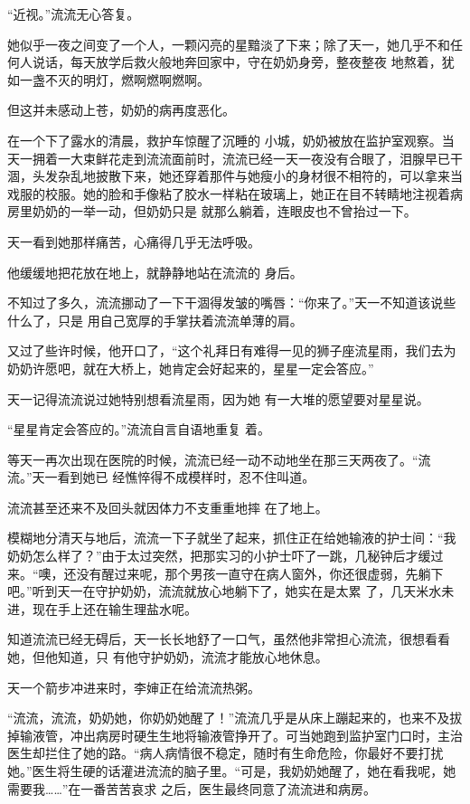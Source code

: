 \documentclass{article}
\begin{document}
“近视。”流流无心答复。 

她似乎一夜之间变了一个人，一颗闪亮的星黯淡了下来；除了天一，她几乎不和任何人说话，每天放学后救火般地奔回家中，守在奶奶身旁，整夜整夜
地熬着，犹如一盏不灭的明灯，燃啊燃啊燃啊。 


但这并未感动上苍，奶奶的病再度恶化。 

在一个下了露水的清晨，救护车惊醒了沉睡的
\newpage
小城，奶奶被放在监护室观察。当天一拥着一大束鲜花走到流流面前时，流流已经一天一夜没有合眼了，泪腺早已干涸，头发杂乱地披散下来，她还穿着那件与她瘦小的身材很不相符的，可以拿来当戏服的校服。她的脸和手像粘了胶水一样粘在玻璃上，她正在目不转睛地注视着病房里奶奶的一举一动，但奶奶只是
就那么躺着，连眼皮也不曾抬过一下。 

天一看到她那样痛苦，心痛得几乎无法呼吸。

他缓缓地把花放在地上，就静静地站在流流的
身后。 

不知过了多久，流流挪动了一下干涸得发皱的嘴唇：“你来了。”天一不知道该说些什么了，只是
用自己宽厚的手掌扶着流流单薄的肩。 

又过了些许时候，他开口了，“这个礼拜日有难得一见的狮子座流星雨，我们去为奶奶许愿吧，就在大桥上，她肯定会好起来的，星星一定会答应。”

\newpage

天一记得流流说过她特别想看流星雨，因为她
有一大堆的愿望要对星星说。 

“星星肯定会答应的。”流流自言自语地重复
着。 

等天一再次出现在医院的时候，流流已经一动不动地坐在那三天两夜了。“流流。”天一看到她已
经憔悴得不成模样时，忍不住叫道。 

流流甚至还来不及回头就因体力不支重重地摔
在了地上。 

模糊地分清天与地后，流流一下子就坐了起来，抓住正在给她输液的护士间：“我奶奶怎么样了？”由于太过突然，把那实习的小护士吓了一跳，几秘钟后才缓过来。“噢，还没有醒过来呢，那个男孩一直守在病人窗外，你还很虚弱，先躺下吧。”听到天一在守护奶奶，流流就放心地躺下了，她实在是太累
了，几天米水未进，现在手上还在输生理盐水呢。 

\newpage

知道流流已经无碍后，天一长长地舒了一口气，虽然他非常担心流流，很想看看她，但他知道，只
有他守护奶奶，流流才能放心地休息。 

天一个箭步冲进来时，李婶正在给流流热粥。

“流流，流流，奶奶她，你奶奶她醒了！”流流几乎是从床上蹦起来的，也来不及拔掉输液管，冲出病房时硬生生地将输液管挣开了。可当她跑到监护室门口时，主治医生却拦住了她的路。“病人病情很不稳定，随时有生命危险，你最好不要打扰她。”医生将生硬的话灌进流流的脑子里。“可是，我奶奶她醒了，她在看我呢，她需要我……”在一番苦苦哀求
之后，医生最终同意了流流进和病房。 
\end{document}
